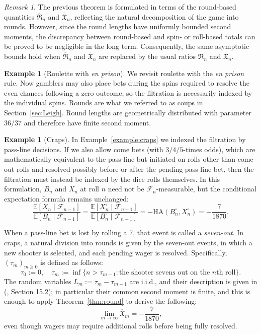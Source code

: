 \documentclass{article}
\theoremstyle{definition}
\newtheorem{example}[theorem]{Example}
\theoremstyle{remark}
\newtheorem{remark}[theorem]{Remark}
\newcommand{\E}{\mathbb{E}}
\newcommand{\F}{\mathscr{F}}
\newcommand{\HA}{\mathrm{HA}}
\begin{document}
\begin{remark}
The previous theorem is formulated in terms of the round-based quantities $\overline{\mathfrak{R}}_n$ and $\overline{\mathfrak{X}}_n$, reflecting the natural decomposition of the game into rounds.
However, since the round lengths have uniformly bounded second moments, the discrepancy between round-based and spin- or roll-based totals can be proved to be negligible in the long term.
Consequently, the same asymptotic bounds hold when $\overline{\mathfrak{R}}_n$ and $\overline{\mathfrak{X}}_n$ are replaced by the usual ratios $\mathfrak{R}_n$ and $\mathfrak{X}_n$.
\end{remark}


\begin{example}[Roulette with \textit{en prison}]
We revisit roulette with the \textit{en prison} rule.  
Now gamblers may also place bets during the spins required to resolve the even chances following a zero outcome, so the filtration is necessarily indexed by the individual spins.  Rounds are what we referred to as coups in Section~\ref{sec:Leigh}.  Round lengths are geometrically distributed with parameter $36/37$ and therefore have finite second moment.
\end{example}


\begin{example}[Craps]
In Example~\ref{example:craps} we indexed the filtration by pass-line decisions.  
If we also allow come bets (with $3/4/5$-times odds), which are mathematically equivalent to the pass-line but initiated on rolls other than come-out rolls and resolved possibly before or after the pending pass-line bet, then the filtration must instead be indexed by the dice rolls themselves.  
In this formulation, $B_n$ and $X_n$ at roll $n$ need not be $\F_n$-measurable, but the conditional expectation formula remains unchanged:
\[
\frac{\E[X_n\mid\F_{n-1}]}{\E[B_n\mid\F_{n-1}]} 
= \frac{\E[X_n^{\circ}\mid\F_{n-1}]}{\E[B_n^{\circ}\mid\F_{n-1}]} 
= -\HA(B_n^{\circ},X_n^{\circ}) 
= -\frac{7}{1870}.
\]

When a pass-line bet is lost by rolling a 7, that event is called a \textit{seven-out}.
In craps, a natural division into rounds is given by the seven-out events, in which a new shooter is selected, and each pending wager is resolved.
Specifically, $(\tau_m)_{m\ge 0}$ is defined as follows:
\begin{equation*}
    \tau_0 := 0, \quad \tau_m := \inf\{n> \tau_{m-1}: \text{the shooter sevens out on the $n$th roll}\}.
\end{equation*}
The random variables $L_m := \tau_m - \tau_{m-1}$ are i.i.d., and their description is given in \citeauthor{E10} (\citeyear{E10}, Section 15.2); in particular their common second moment is finite, and this is enough to apply Theorem~\ref{thm:round} to derive the following: 
\[
\lim_{m\to\infty}\overline{\mathfrak{X}}_m=-\frac{7}{1870},
\]
even though wagers may require additional rolls before being fully resolved.
\end{example}
\end{document}
